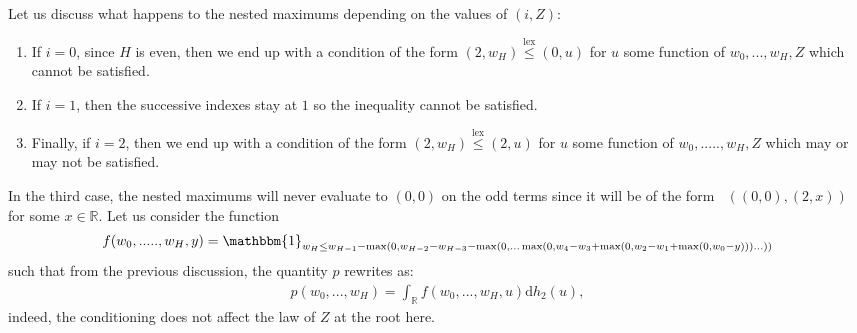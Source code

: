 \documentclass[11pt]{article}
\DeclareMathOperator{\lex}{lex}
\DeclareMathOperator*{\maxlex}{\overset{\lex}{\max}}
\begin{document}
Let us discuss what happens to the nested maximums depending on the values of $(i,Z)$:

\begin{enumerate}
    \item If $i=0$, since $H$ is even, then we end up with a condition of the form $(2,w_H) \overset{\lex}{\leq} (0,u)$ for $u$ some function of $w_0,...,w_H,Z$ which cannot be satisfied.
    \item If $i=1$, then the successive indexes stay at $1$ so the inequality cannot be satisfied.
    \item Finally, if $i=2$, then we end up with a condition of the form $(2,w_H) \overset{\lex}{\leq} (2,u)$ for $u$ some function of $w_0,.....,w_H,Z$ which may or may not be satisfied.
\end{enumerate}

In the third case, the nested maximums will never evaluate to $(0,0)$ on the odd terms since it will be of the form $\maxlex((0,0),(2,x))$ for some $x \in \mathbb{R}$. 
Let us consider the function
\begin{align*}
    f(w_0,.....,w_H,y)=\mathbbm{1}_{w_H \leq w_{H-1}-\max(0, w_{H-2}-w_{H-3}-\max(0,... \max(0,w_4-w_3+ \max(0,w_2 -w_1+\max(0,w_0-y)))...))}
\end{align*}
such that from the previous discussion, the quantity $p$ rewrites as:
\begin{align*}
    p(w_0,...,w_H)=\int_{\mathbb{R}} f(w_0,...,w_H,u) \mathrm{d}h_2(u),
\end{align*}
indeed, the conditioning does not affect the law of $Z$ at the root here.
\end{document}
